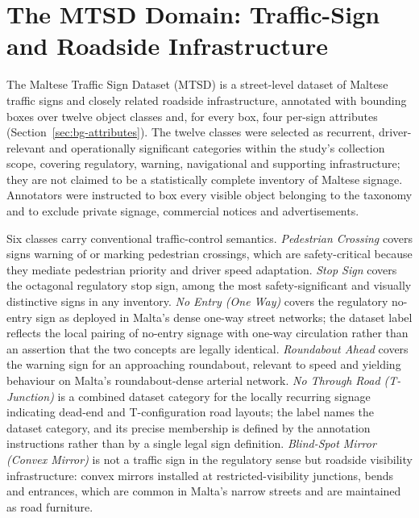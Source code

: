 \section{The MTSD Domain: Traffic-Sign and Roadside Infrastructure}
\label{sec:bg-mtsd}

The Maltese Traffic Sign Dataset (MTSD) is a street-level dataset of Maltese traffic signs and closely related roadside infrastructure, annotated with bounding boxes over twelve object classes and, for every box, four per-sign attributes (Section~\ref{sec:bg-attributes}). The twelve classes were selected as recurrent, driver-relevant and operationally significant categories within the study's collection scope, covering regulatory, warning, navigational and supporting infrastructure; they are not claimed to be a statistically complete inventory of Maltese signage. Annotators were instructed to box every visible object belonging to the taxonomy and to exclude private signage, commercial notices and advertisements.

Six classes carry conventional traffic-control semantics. \emph{Pedestrian Crossing} covers signs warning of or marking pedestrian crossings, which are safety-critical because they mediate pedestrian priority and driver speed adaptation. \emph{Stop Sign} covers the octagonal regulatory stop sign, among the most safety-significant and visually distinctive signs in any inventory. \emph{No Entry (One Way)} covers the regulatory no-entry sign as deployed in Malta's dense one-way street networks; the dataset label reflects the local pairing of no-entry signage with one-way circulation rather than an assertion that the two concepts are legally identical. \emph{Roundabout Ahead} covers the warning sign for an approaching roundabout, relevant to speed and yielding behaviour on Malta's roundabout-dense arterial network. \emph{No Through Road (T-Junction)} is a combined dataset category for the locally recurring signage indicating dead-end and T-configuration road layouts; the label names the dataset category, and its precise membership is defined by the annotation instructions rather than by a single legal sign definition. \emph{Blind-Spot Mirror (Convex Mirror)} is not a traffic sign in the regulatory sense but roadside visibility infrastructure: convex mirrors installed at restricted-visibility junctions, bends and entrances, which are common in Malta's narrow streets and are maintained as road furniture.

